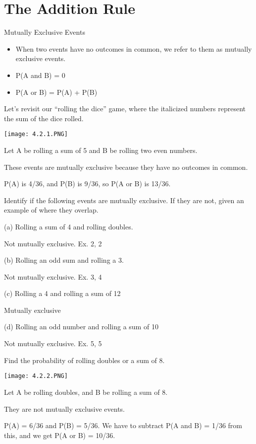 \documentclass[../stats.tex]{subfiles}
\begin{document}
\section{The Addition Rule}
Mutually Exclusive Events 
\begin{itemize}
    \item When two events have no outcomes in common, we refer to them as mutually exclusive events.
    \item P(A and B) = 0
    \item P(A or B) = P(A) + P(B)
\end{itemize}

\begin{example}
    Let's revisit our ``rolling the dice'' game, where the italicized numbers represent the sum of the dice rolled.
    \begin{center}
        \texttt{[image: 4.2.1.PNG]}
    \end{center}
    Let A be rolling a sum of 5 and B be rolling two even numbers.

    These events are mutually exclusive because they have no outcomes in common.

    P(A) is 4/36, and P(B) is 9/36, so P(A or B) is 13/36.    
\end{example}

\begin{example}
    Identify if the following events are mutually exclusive. If they are not, given an example of where they overlap.

    (a) Rolling a sum of 4 and rolling doubles.

    Not mutually exclusive. Ex. 2, 2

    (b) Rolling an odd sum and rolling a 3.

    Not mutually exclusive. Ex. 3, 4

    (c) Rolling a 4 and rolling a sum of 12

    Mutually exclusive

    (d) Rolling an odd number and rolling a sum of 10 

    Not mutually exclusive. Ex. 5, 5
\end{example}
\medbreak 
\begin{example}
    Find the probability of rolling doubles or a sum of 8.
    \begin{center}
        \texttt{[image: 4.2.2.PNG]}
    \end{center}

    Let A be rolling doubles, and B be rolling a sum of 8.

    They are not mutually exclusive events.

    P(A) = 6/36 and P(B) = 5/36. We have to subtract P(A and B) = 1/36 from this, and we get P(A or B) = 10/36.
\end{example}
\end{document}
